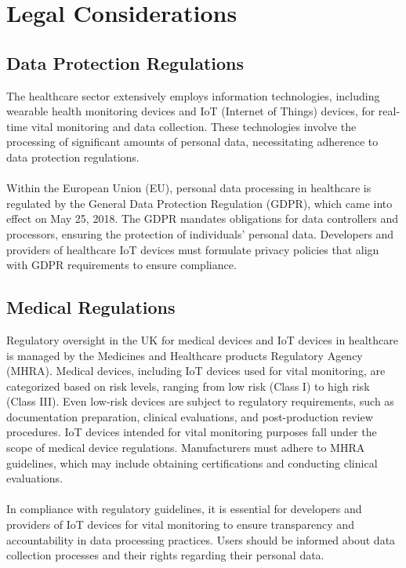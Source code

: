 \chapter{Legal Considerations}
\label{app:legal}

\section{Data Protection Regulations}

The healthcare sector extensively employs information technologies, including wearable health monitoring devices and IoT (Internet of Things) devices, for real-time vital monitoring and data collection. These technologies involve the processing of significant amounts of personal data, necessitating adherence to data protection regulations. \\ \\
Within the European Union (EU), personal data processing in healthcare is regulated by the General Data Protection Regulation (GDPR), which came into effect on May 25, 2018. The GDPR mandates obligations for data controllers and processors, ensuring the protection of individuals' personal data. Developers and providers of healthcare IoT devices must formulate privacy policies that align with GDPR requirements to ensure compliance.

\section{Medical Regulations}

Regulatory oversight in the UK for medical devices and IoT devices in healthcare is managed by the Medicines and Healthcare products Regulatory Agency (MHRA). Medical devices, including IoT devices used for vital monitoring, are categorized based on risk levels, ranging from low risk (Class I) to high risk (Class III). Even low-risk devices are subject to regulatory requirements, such as documentation preparation, clinical evaluations, and post-production review procedures. IoT devices intended for vital monitoring purposes fall under the scope of medical device regulations. Manufacturers must adhere to MHRA guidelines, which may include obtaining certifications and conducting clinical evaluations. \\ \\
In compliance with regulatory guidelines, it is essential for developers and providers of IoT devices for vital monitoring to ensure transparency and accountability in data processing practices. Users should be informed about data collection processes and their rights regarding their personal data.

